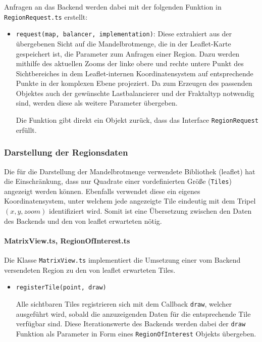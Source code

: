 Anfragen an das Backend werden dabei mit der folgenden Funktion in \verb|RegionRequest.ts| erstellt:
\begin{itemize}
	\item \verb|request(map, balancer, implementation)|:
	      Diese extrahiert aus der übergebenen Sicht auf die Mandelbrotmenge, die in der Leaflet-Karte gespeichert ist,
	      die Parameter zum Anfragen einer Region.
	      Dazu werden mithilfe des aktuellen Zooms der linke obere und rechte untere Punkt des Sichtbereiches
	      in dem Leaflet-internen Koordinatensystem auf entsprechende Punkte in der komplexen Ebene projeziert.
	      Da zum Erzeugen des passenden Objektes auch der gewünschte Lastbalancierer und der Fraktaltyp notwendig sind,
	      werden diese als weitere Parameter übergeben.

	      Die Funktion gibt direkt ein Objekt zurück, dass das Interface \verb|RegionRequest| erfüllt.
\end{itemize}

\subsubsection{Darstellung der Regionsdaten} %

Die für die Darstellung der Mandelbrotmenge verwendete Bibliothek (leaflet) hat die Einschränkung, dass
nur Quadrate einer vordefinierten Größe (\verb|Tiles|) angezeigt werden können. Ebenfalls verwendet diese ein
eigenes Koordinatensystem, unter welchem jede angezeigte Tile eindeutig mit dem Tripel \( (x, y, zoom) \)
identifiziert wird. Somit ist eine Übersetzung zwischen den Daten des Backends und den von leaflet erwarteten nötig.

\paragraph{MatrixView.ts, RegionOfInterest.ts}\label{par:matrixView}
Die Klasse \verb|MatrixView.ts| implementiert die Umsetzung einer vom Backend versendeten Region zu
den von leaflet erwarteten Tiles.
\begin{itemize}
	\item \verb|registerTile(point, draw)|

	      Alle sichtbaren Tiles registrieren sich mit dem Callback \verb|draw|,
	      welcher ausgeführt wird, sobald die anzuzeigenden Daten für die
	      entsprechende Tile verfügbar sind. Diese Iterationswerte des Backends werden dabei der \verb|draw| Funktion als Parameter
	      in Form eines \verb|RegionOfInterest| Objekts übergeben.
\end{itemize}


